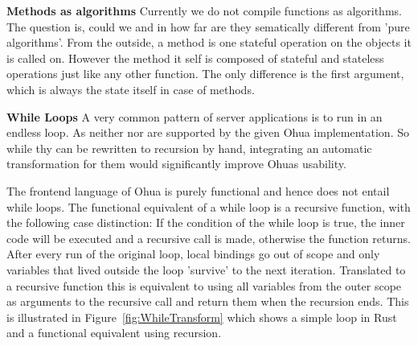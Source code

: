 \textbf{Methods as algorithms}
Currently we do not compile  functions as algorithms. The question is, could we and in how far are they sematically different from 'pure algorithms'. From the outside, a method is one stateful operation on the objects it is called on. However the method it self is composed of stateful and stateless operations just like any other function. The only difference is the first argument, which is always the state itself in case of methods. 


\textbf{While Loops}
\label{subsubsec:WhileLoops}
A very common pattern of server applications is to run in an endless loop. As neither  nor  are supported by the given Ohua implementation. So while thy can be rewritten to recursion by hand, integrating an automatic transformation for them would significantly improve Ohuas usability. 

The frontend language of Ohua is purely functional and hence does not entail while loops. The functional equivalent of a while loop is a recursive function, with the following case distinction: If the condition of the while loop is true, the inner code will be executed and a recursive call is made, otherwise the function returns. After every run of the original loop, local bindings go out of scope and only variables that lived outside the loop 'survive' to the next iteration. Translated to a recursive function this is equivalent to using all variables from the outer scope as arguments to the recursive call and return them when the recursion ends. This is illustrated in Figure~\ref{fig:WhileTransform} which shows a simple  loop in Rust and a functional equivalent using recursion. 

